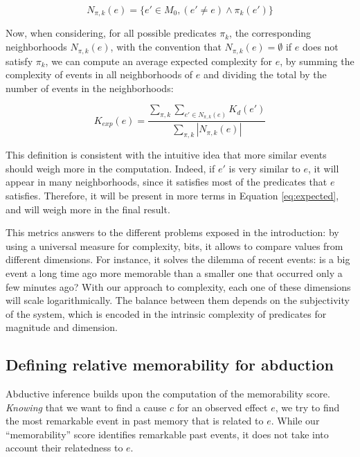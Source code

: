 \documentclass[entropy,article,submit,moreauthors,pdftex]{Definitions/mdpi}
\begin{document}
\begin{equation}
    \label{eq:similar}
    N_{\pi, k}(e) = \{e'\in M_0, (e' \neq e) \wedge \pi_k(e')\}
\end{equation}

Now, when considering, for all possible predicates $\pi_k$, the corresponding
neighborhoods $N_{\pi, k}(e)$, with the convention that $N_{\pi, k}(e) = \emptyset$
if $e$ does not satisfy $\pi_k$, we can compute an average expected complexity for $e$, by summing the complexity of events in all neighborhoods of $e$ and dividing the total by the number of events in the neighborhoods:

\begin{equation}
    \label{eq:expected}
    K_{exp}(e) = \frac{
    \sum_{\pi, k} \sum_{e' \in N_{\pi, k}(e)} K_d(e')
    }{
    \sum_{\pi, k} |N_{\pi, k}(e)|
    }
\end{equation}

This definition is consistent with the intuitive idea that more similar events should weigh more in the computation. Indeed, if $e'$
is very similar to $e$, it will appear in many neighborhoods, since it
satisfies most of the predicates that $e$ satisfies. Therefore, it will
be present in more terms in Equation \ref{eq:expected}, and will weigh more in
the final result.

This metrics answers to the different problems exposed in the introduction: by using a universal measure for complexity, bits, it allows to compare values from different dimensions. For instance, it solves the dilemma of recent events: is a big event a long time ago more memorable than a smaller one that occurred only a few minutes ago? With our approach to complexity, each one of these dimensions will scale logarithmically. The balance between them depends on the subjectivity of the system, which is encoded in the intrinsic complexity of predicates for magnitude and dimension. 

\subsection{Defining relative memorability for abduction}
Abductive inference builds upon the computation
of the memorability score. \emph{Knowing} that we want to find a cause $c$
for an observed effect $e$, we try to find the most remarkable event in past
memory that is related to $e$. While our ``memorability'' score identifies remarkable past events, it does not take into account their relatedness to $e$.
\end{document}
